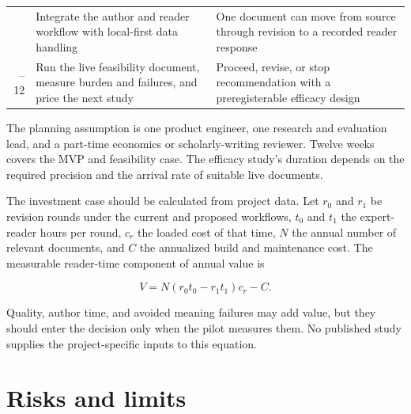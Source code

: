 \documentclass[
  11pt,
  english,
]{article}
\begin{document}
\begin{longtable}[]{@{}rll@{}}
\begin{minipage}[t]{0.37\columnwidth}
\end{minipage} & \begin{minipage}[t]{0.27\columnwidth}\raggedright
Integrate the author and reader workflow with local-first data
handling\strut
\end{minipage} & \begin{minipage}[t]{0.27\columnwidth}\raggedright
One document can move from source through revision to a recorded reader
response\strut
\end{minipage}\tabularnewline
\begin{minipage}[t]{0.37\columnwidth}\raggedleft
9--12\strut
\end{minipage} & \begin{minipage}[t]{0.27\columnwidth}\raggedright
Run the live feasibility document, measure burden and failures, and
price the next study\strut
\end{minipage} & \begin{minipage}[t]{0.27\columnwidth}\raggedright
Proceed, revise, or stop recommendation with a preregisterable efficacy
design\strut
\end{minipage}\tabularnewline
\bottomrule
\end{longtable}

The planning assumption is one product engineer, one research and
evaluation lead, and a part-time economics or scholarly-writing
reviewer. Twelve weeks covers the MVP and feasibility case. The efficacy
study's duration depends on the required precision and the arrival rate
of suitable live documents.

The investment case should be calculated from project data. Let \(r_0\)
and \(r_1\) be revision rounds under the current and proposed workflows,
\(t_0\) and \(t_1\) the expert-reader hours per round, \(c_r\) the
loaded cost of that time, \(N\) the annual number of relevant documents,
and \(C\) the annualized build and maintenance cost. The measurable
reader-time component of annual value is

\[
V = N(r_0t_0-r_1t_1)c_r-C.
\]

Quality, author time, and avoided meaning failures may add value, but
they should enter the decision only when the pilot measures them. No
published study supplies the project-specific inputs to this equation.

\hypertarget{risks-and-limits}{%
\section{Risks and limits}\label{risks-and-limits}}
\end{document}
